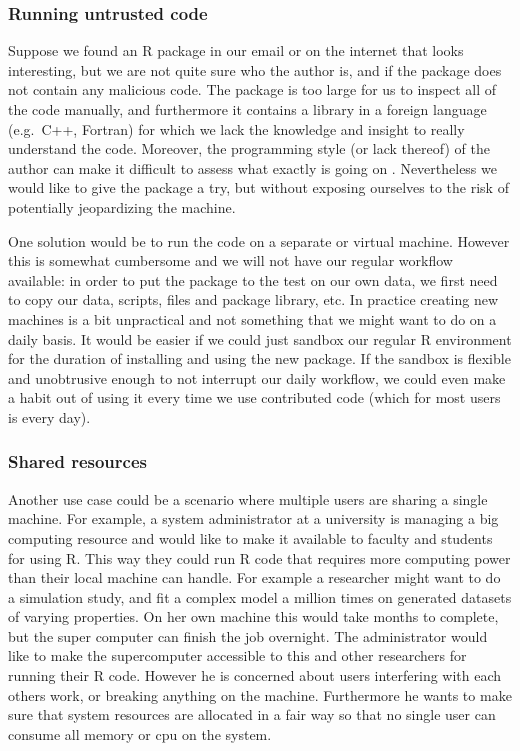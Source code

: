 \documentclass[article]{jss}
\newcommand{\R}{\textsf{R}\xspace}
\newcommand{\Cpp}{\textsf{C++}\xspace}
\newcommand{\Fortran}{\textsf{Fortran}\xspace}
\begin{document}
\subsubsection{Running untrusted code}

Suppose we found an \R package in our email or on the internet that
looks interesting, but we are not quite sure who the author is, and if the
package does not contain any malicious code. The package is too large for us to
inspect all of the code manually, and furthermore it contains a library in a
foreign language (e.g.\ \Cpp, \Fortran) for which we lack
the knowledge and insight to really understand the code. Moreover, the
programming style (or lack thereof) of the author can make it difficult to
assess what exactly is going on \citep{ioccc}. Nevertheless we would like to
give the package a try, but without exposing ourselves to the risk of potentially
jeopardizing the machine.

One solution would be to run the code on a separate or virtual machine. However
this is somewhat cumbersome and we will not have our regular workflow available:
in order to put the package to the test on our own data, we first need to
copy our data, scripts, files and package library, etc. In practice creating new
machines is a bit unpractical and not something that we might want to do on a
daily basis. It would be easier if we could just sandbox our regular \R
environment for the duration of installing and using the new package. If the
sandbox is flexible and unobtrusive enough to not interrupt our daily workflow,
we could even make a habit out of using it every time we use contributed code
(which for most users is every day).

\subsubsection{Shared resources}

Another use case could be a scenario where multiple users are sharing a single
machine. For example, a system administrator at a university is managing a big
computing resource and would like to make it available to faculty and students
for using \R. This way they could run \R code that requires
more computing power than their local machine can handle. For example a
researcher might want to do a simulation study, and fit a complex model a
million times on generated datasets of varying properties. On her own machine
this would take months to complete, but the super computer can finish the job
overnight. The administrator would like to make the supercomputer accessible to
this and other researchers for running their \R code. However he is
concerned about users interfering with each others work, or breaking anything
on the machine. Furthermore he wants to make sure that system resources are
allocated in a fair way so that no single user can consume all memory or cpu on
the system.
\end{document}
